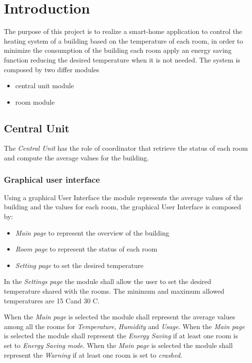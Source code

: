 \section{Introduction}
The purpose of this project is to realize a smart-home application to control the heating system of a building based on the temperature of each room, in order to minimize the consumption of the building each room apply an energy saving function reducing the desired temperature when it is not needed.
The system is composed by two differ modules
\begin{itemize}
	\item central unit module 
	\item room module
\end{itemize}

\subsection{Central Unit}
The \textit{Central Unit} has the role of coordinator that retrieve the status of each room and compute the average values for the building.\\

\subsubsection{Graphical user interface}
Using a graphical User Interface the module represents the average values of the building and the values for each room, the graphical User Interface is composed by:
\begin{itemize}
	\item \textit{Main page} to represent the overview of the building
	\item \textit{Room page} to represent the status of each room
	\item \textit{Setting page} to set the desired temperature
\end{itemize}
In the \textit{Settings page} the module shall allow the user to set the desired temperature shared with the rooms.
The minimum and maximum allowed temperatures are 15 C\degree and 30 C\degree.

When the \textit{Main page} is selected the module shall represent the average values among all the rooms for \textit{Temperature}, \textit{Humidity} and \textit{Usage}.
When the \textit{Main page} is selected the module shall represent the \textit{Energy Saving} if at least one room is set to \textit{Energy Saving mode}.
When the \textit{Main page} is selected the module shall represent the \textit{Warning} if at least one room is set to \textit{crashed}.

